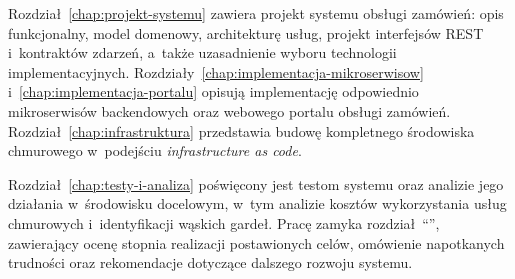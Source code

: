 Rozdział~\ref{chap:projekt-systemu} zawiera projekt systemu obsługi zamówień: opis funkcjonalny, model domenowy, architekturę usług, 
projekt interfejsów REST i~kontraktów zdarzeń, a~także uzasadnienie wyboru technologii implementacyjnych. 
Rozdziały~\ref{chap:implementacja-mikroserwisow} i~\ref{chap:implementacja-portalu} opisują implementację odpowiednio mikroserwisów 
backendowych oraz webowego portalu obsługi zamówień. Rozdział~\ref{chap:infrastruktura} przedstawia budowę kompletnego środowiska 
chmurowego w~podejściu \emph{infrastructure as code}.

Rozdział~\ref{chap:testy-i-analiza} poświęcony jest testom systemu oraz analizie jego działania w~środowisku docelowym, 
w~tym analizie kosztów wykorzystania usług chmurowych i~identyfikacji wąskich gardeł. Pracę zamyka rozdział~\enquote{},
zawierający ocenę stopnia realizacji postawionych celów, omówienie napotkanych trudności oraz rekomendacje dotyczące dalszego rozwoju systemu.
